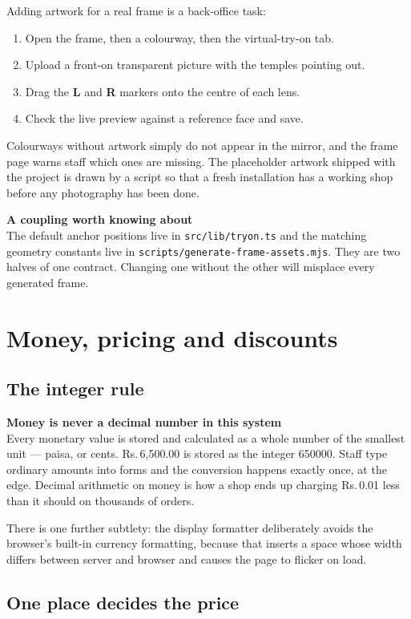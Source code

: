\documentclass[11pt,a4paper]{report}
\newcommand{\code}[1]{\texttt{\small #1}}
\newcommand{\keybox}[2]{%
  \begin{center}
  \begin{minipage}{0.94\textwidth}
  \colorbox{vclight}{\parbox{\dimexpr\textwidth-2\fboxsep}{%
    \vspace{3pt}\textbf{\color{vcblue}#1}\\[3pt]#2\vspace{4pt}}}
  \end{minipage}
  \end{center}}
\begin{document}
Adding artwork for a real frame is a back-office task:

\begin{enumerate}
  \item Open the frame, then a colourway, then the virtual-try-on tab.
  \item Upload a front-on transparent picture with the temples pointing out.
  \item Drag the \textbf{L} and \textbf{R} markers onto the centre of each
        lens.
  \item Check the live preview against a reference face and save.
\end{enumerate}

Colourways without artwork simply do not appear in the mirror, and the frame
page warns staff which ones are missing. The placeholder artwork shipped with
the project is drawn by a script so that a fresh installation has a working
shop before any photography has been done.

\keybox{A coupling worth knowing about}{The default anchor positions live in
\code{src/lib/tryon.ts} and the matching geometry constants live in
\code{scripts/generate-frame-assets.mjs}. They are two halves of one contract.
Changing one without the other will misplace every generated frame.}

\chapter{Money, pricing and discounts}

\section{The integer rule}

\keybox{Money is never a decimal number in this system}{Every monetary value
is stored and calculated as a whole number of the smallest unit --- paisa, or
cents. Rs.\,6{,}500.00 is stored as the integer 650000. Staff type ordinary
amounts into forms and the conversion happens exactly once, at the edge.
Decimal arithmetic on money is how a shop ends up charging Rs.\,0.01 less than
it should on thousands of orders.}

There is one further subtlety: the display formatter deliberately avoids the
browser's built-in currency formatting, because that inserts a space whose
width differs between server and browser and causes the page to flicker on
load.

\section{One place decides the price}
\end{document}

